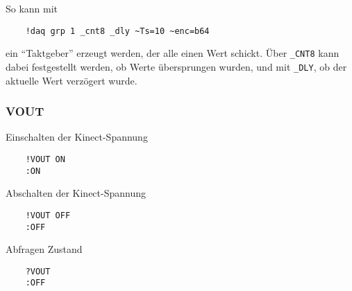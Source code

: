 So kann mit
\begin{verbatim}
	!daq grp 1 _cnt8 _dly ~Ts=10 ~enc=b64
\end{verbatim}
ein "`Taktgeber"' erzeugt werden, der alle  einen Wert schickt. Über \verb|_CNT8| kann dabei festgestellt werden, ob Werte übersprungen wurden, und mit \verb|_DLY|, ob der aktuelle Wert verzögert wurde.



\subsubsection{VOUT}

Einschalten der Kinect-Spannung
\begin{verbatim}
	!VOUT ON
	:ON
\end{verbatim}

Abschalten der Kinect-Spannung
\begin{verbatim}
	!VOUT OFF
	:OFF
\end{verbatim}


Abfragen Zustand
\begin{verbatim}
	?VOUT
	:OFF
\end{verbatim}










